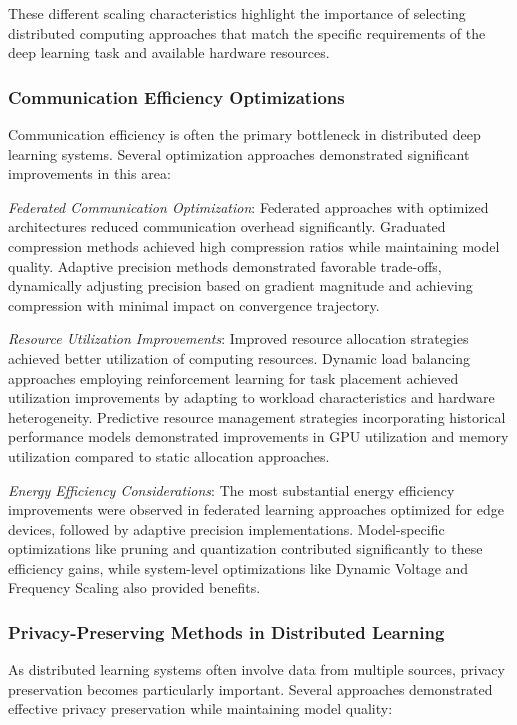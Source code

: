 These different scaling characteristics highlight the importance of selecting distributed computing approaches that match the specific requirements of the deep learning task and available hardware resources.

\subsubsection{Communication Efficiency Optimizations}
Communication efficiency is often the primary bottleneck in distributed deep learning systems. Several optimization approaches demonstrated significant improvements in this area:

\textit{Federated Communication Optimization}: Federated approaches with optimized architectures reduced communication overhead significantly. Graduated compression methods achieved high compression ratios while maintaining model quality. Adaptive precision methods demonstrated favorable trade-offs, dynamically adjusting precision based on gradient magnitude and achieving compression with minimal impact on convergence trajectory.

\textit{Resource Utilization Improvements}: Improved resource allocation strategies achieved better utilization of computing resources. Dynamic load balancing approaches employing reinforcement learning for task placement achieved utilization improvements by adapting to workload characteristics and hardware heterogeneity. Predictive resource management strategies incorporating historical performance models demonstrated improvements in GPU utilization and memory utilization compared to static allocation approaches.

\textit{Energy Efficiency Considerations}: The most substantial energy efficiency improvements were observed in federated learning approaches optimized for edge devices, followed by adaptive precision implementations. Model-specific optimizations like pruning and quantization contributed significantly to these efficiency gains, while system-level optimizations like Dynamic Voltage and Frequency Scaling also provided benefits.

\subsubsection{Privacy-Preserving Methods in Distributed Learning}
As distributed learning systems often involve data from multiple sources, privacy preservation becomes particularly important. Several approaches demonstrated effective privacy preservation while maintaining model quality:

